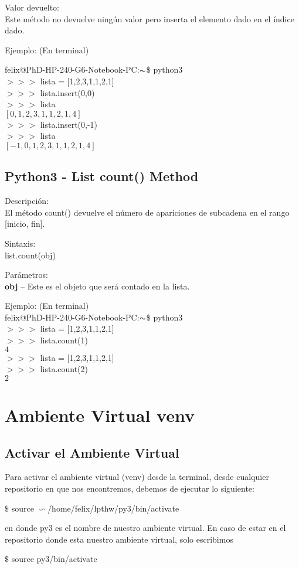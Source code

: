 \documentclass[12pt,openany]{scrbook}
\begin{document}
Valor devuelto:\\
Este método no devuelve ningún valor pero inserta el elemento dado en el \'indice dado.

Ejemplo:
(En terminal)

felix@PhD-HP-240-G6-Notebook-PC:$\thicksim$\vspace{0cm}$\$$   python3 \\
$>>>$ lista = [1,2,3,1,1,2,1]\\
$>>>$ lista.insert(0,0)\\
$>>>$ lista \\
$[0, 1, 2, 3, 1, 1, 2, 1, 4]$ \\
$>>>$ lista.insert(0,-1)\\
$>>>$ lista \\
$[-1, 0, 1, 2, 3, 1, 1, 2, 1, 4]$




\subsection{Python3 - List count() Method}
Descripci\'on:\\
El m\'etodo count() devuelve el n\'umero de apariciones de subcadena en el rango [inicio, fin].

Sintaxis:\\
list.count(obj)

Par\'ametros:\\
\textbf{obj} -- Este es el objeto que ser\'a contado en la
lista.

Ejemplo:
(En terminal)\\

felix@PhD-HP-240-G6-Notebook-PC:$\thicksim$\vspace{0cm}$\$$   python3 \\
$>>>$ lista = [1,2,3,1,1,2,1]\\
$>>>$ lista.count(1)\\
$4$
\\

$>>>$ lista = [1,2,3,1,1,2,1]\\
$>>>$ lista.count(2)\\
$2$


\section{Ambiente Virtual venv}

\subsection{Activar el Ambiente Virtual}

Para activar el ambiente virtual (venv) desde la terminal, 
desde cualquier repositorio en que nos encontremos, debemos
de ejecutar lo siguiente:

\hspace{1cm} $ \$ $ source $\backsim$/home/felix/lpthw/py3/bin/activate

en donde py3 es el nombre de nuestro ambiente virtual. En caso de estar
en el repositorio donde esta nuestro ambiente virtual, solo escribimos

\hspace{1cm} $ \$ $ source py3/bin/activate
\end{document}
